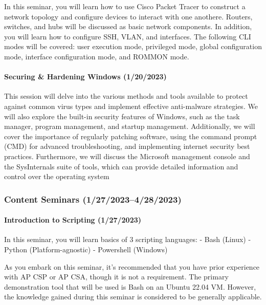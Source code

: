 \documentclass[
  letterpaper,
  DIV=11,
  numbers=noendperiod]{scrartcl}
\let\oldparagraph\paragraph
\renewcommand{\paragraph}[1]{\oldparagraph{#1}\mbox{}}
\begin{document}
In this seminar, you will learn how to use Cisco Packet Tracer to
construct a network topology and configure devices to interact with one
anothere. Routers, switches, and hubs will be discussed as basic network
components. In addition, you will learn how to configure SSH, VLAN, and
interfaces. The following CLI modes will be covered: user execution
mode, privileged mode, global configuration mode, interface
configuration mode, and ROMMON mode.

\newpage{}

\hypertarget{securing-hardening-windows-1202023}{%
\paragraph{Securing \& Hardening Windows
(1/20/2023)}\label{securing-hardening-windows-1202023}}

This session will delve into the various methods and tools available to
protect against common virus types and implement effective anti-malware
strategies. We will also explore the built-in security features of
Windows, such as the task manager, program management, and startup
management. Additionally, we will cover the importance of regularly
patching software, using the command prompt (CMD) for advanced
troubleshooting, and implementing internet security best practices.
Furthermore, we will discuss the Microsoft management console and the
SysInternals suite of tools, which can provide detailed information and
control over the operating system

\hypertarget{content-seminars-12720234282023}{%
\subsubsection{Content Seminars
(1/27/2023--4/28/2023)}\label{content-seminars-12720234282023}}

\hypertarget{introduction-to-scripting-1272023}{%
\paragraph{Introduction to Scripting
(1/27/2023)}\label{introduction-to-scripting-1272023}}

In this seminar, you will learn basics of 3 scripting languages: - Bash
(Linux) - Python (Platform-agnostic) - Powershell (Windows)

As you embark on this seminar, it's recommended that you have prior
experience with AP CSP or AP CSA, though it is not a requirement. The
primary demonstration tool that will be used is Bash on an Ubuntu 22.04
VM. However, the knowledge gained during this seminar is considered to
be generally applicable.
\end{document}
